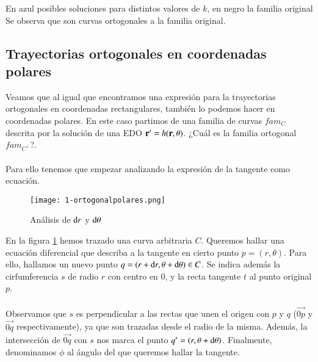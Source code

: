 \begin{eg}
\begin{center}
\hfill \break
        \vspace{1pt}
        En azul posibles soluciones para distintos valores de $k$, en negro la familia original\\
        Se observa que son curvas ortogonales a la familia original.
    \end{center}
\end{eg}

\subsection{Trayectorias ortogonales en coordenadas polares}
Veamos que al igual que encontramos una expresión para la trayectorias ortogonales en coordenadas rectangulares, también lo podemos hacer en coordenadas polares. En este caso partimos de una familia de curvas $fam_C$ descrita por la solución de una EDO $\mathbf{r'} = h(\mathbf{r}, \theta)$. ¿Cuál es la familia ortogonal $fam_{C^\perp}$?.\\\\
Para ello tenemos que empezar analizando la expresión de la tangente como ecuación.

\begin{wrapfigure}{l}{.6\textwidth}
  \begin{center}
    \texttt{[image: 1-ortogonalpolares.png]}
  \end{center}
  \caption{Análisis de $\mathrm{d} r$ y $\mathrm{d} \theta$}\label{img:1-polort}
\end{wrapfigure}
En la figura \ref{img:1-polort} hemos trazado una curva arbitraria $C$. Queremos hallar una ecuación diferencial que describa a la tangente en cierto punto $p = (r,\theta)$. Para ello, hallamos un nuevo punto $q = (r + \mathrm{d} r, \theta +\mathrm{d} \theta) \in C$. Se indica además la cirfumferencia $s$ de radio $r$ con centro en $0$, y la recta tangente $t$ al punto original $p$.\\\\
Observamos que $s$ es perpendicular a las rectas que unen el origen con $p$ y $q$ ($\vec{0p}$ y $\vec{0q}$ respectivamente), ya que son trazadas desde el radio de la misma. Además, la intersección de $\vec{0q}$ con $s$ nos marca el punto $q' = (r, \theta +\mathrm{d} \theta)$. Finalmente, denominamos $\phi$ al ángulo del que queremos hallar la tangente.

